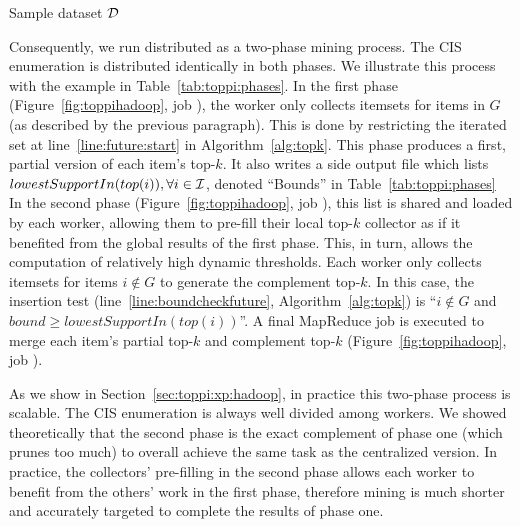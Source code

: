 \begin{table}[tb]
	\centering
	
	\caption{\label{tab:toppi:ex}Sample dataset $\cal D$}
\end{table}




Consequently, we run distributed \toppi as a two-phase mining process.
The CIS enumeration is distributed identically in both phases.
We illustrate this process with the example in Table~\ref{tab:toppi:phases}.
In the first phase (Figure~\ref{fig:toppihadoop}, job ),
the worker  only collects itemsets for items in $G$ (as described by the previous paragraph).
This is done by restricting the iterated set
at line~\ref{line:future:start} in Algorithm~\ref{alg:topk}.
This phase produces a first, partial version of each item's top-$k$.
It also writes a side output file
which lists $lowestSupportIn(top(i)), \forall i \in \cal I$,
denoted ``Bounds'' in Table~\ref{tab:toppi:phases}
In the second phase (Figure~\ref{fig:toppihadoop}, job ),
this list is shared and loaded by each worker,
allowing them to pre-fill their local top-$k$ collector
as if it benefited from the global results of the first phase.
This, in turn, allows the computation of relatively high dynamic thresholds.
Each worker only collects itemsets for items $i \not\in G$ to generate the complement top-$k$.
In this case, the insertion test (line~\ref{line:boundcheckfuture}, Algorithm~\ref{alg:topk})
is ``$i \not\in G$ and $\mathit{bound} \geq \mathit{lowestSupportIn(top(i))}$''.
A final MapReduce job is executed to merge each item's partial top-$k$ and complement top-$k$
(Figure~\ref{fig:toppihadoop}, job ).


\begin{paragraph}{}
	As we show in Section~\ref{sec:toppi:xp:hadoop}, in practice this two-phase process is scalable.
	The CIS enumeration is always well divided among workers.
	We showed theoretically that the second phase is the exact complement of phase one (which prunes too much)
	to overall achieve the same task as the centralized version.
	In practice, the collectors' pre-filling in the second phase allows each worker to benefit
	from the others' work in the first phase,
 	therefore mining is much shorter and accurately targeted to complete the results of phase one.
\end{paragraph}



